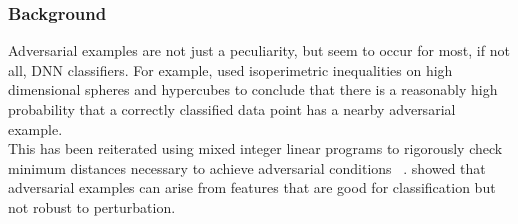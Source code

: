 

\begin{frame}
  \frametitle{Background}

 Adversarial examples are not just a peculiarity, but seem to occur
 for most, if not all, DNN classifiers. For example,
 \citet{inevitable2018} used isoperimetric inequalities on high
 dimensional spheres and hypercubes to conclude that there is a
 reasonably high probability that a correctly classified data point
 has a nearby adversarial example.\\

 This has been reiterated using mixed integer linear programs to rigorously check minimum distances necessary to achieve adversarial conditions ~\citep{tjeng2017evaluating}. \citet{ilyas2019adversarial} showed that adversarial examples can arise from features that are good for classification but not robust to perturbation. 
\end{frame}
  


